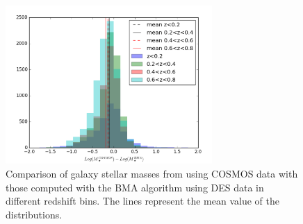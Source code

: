 \begin{figure}\centering \includegraphics[width=0.7\textwidth]{./chapters/chapter2/figs/fig1.png}\caption{Comparison of galaxy stellar masses from \citet{laigle} using COSMOS data with those computed with the BMA algorithm using DES data in different redshift bins. The lines represent the mean value of the distributions. }\label{fig:cosmos}\end{figure}%

